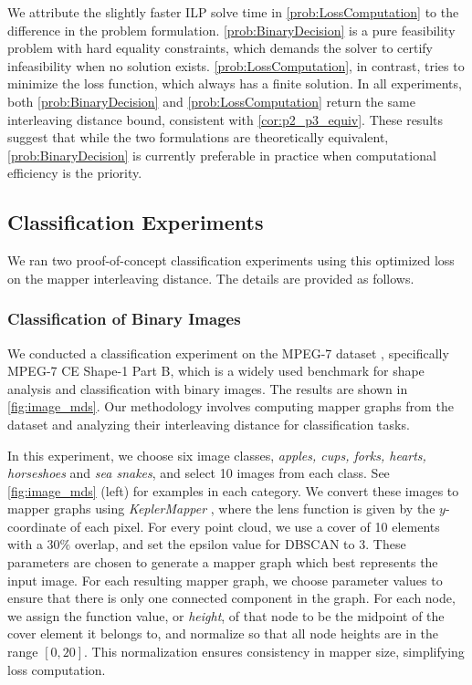 We attribute the slightly faster ILP solve time in \cref{prob:LossComputation} to the difference in the problem formulation.
\cref{prob:BinaryDecision} is a pure feasibility problem with hard equality constraints, which demands the solver to certify infeasibility when no solution exists.
\cref{prob:LossComputation}, in contrast, tries to minimize the loss function, which always has a finite solution.
In all experiments, both \cref{prob:BinaryDecision} and 
\cref{prob:LossComputation} return the same interleaving distance 
bound, consistent with \cref{cor:p2_p3_equiv}.
These results suggest that while the two formulations are theoretically equivalent, \cref{prob:BinaryDecision} is currently preferable in practice when computational efficiency is the priority.

\subsection{Classification Experiments}
\label{ssec:ClassificationBrief}
%

We ran two proof-of-concept classification experiments using this optimized loss on the mapper interleaving distance. 
The details are provided as follows.
\subsubsection{Classification of Binary Images}
\label{ssec:ClassificationMPEG7}
%

We conducted a classification experiment on the MPEG-7 dataset \cite{jeannin1999}, specifically MPEG-7 CE
Shape-1 Part B, which is a widely used benchmark for shape analysis and classification with binary
images.
The results are shown in \cref{fig:image_mds}.
Our methodology involves computing mapper graphs from the dataset and analyzing their interleaving distance for classification tasks.

In this experiment, we choose six image classes, \emph{apples, cups, forks, hearts, horseshoes} and \emph{sea snakes}, and select 10 images from each class.
See \cref{fig:image_mds}  (left) for examples in each category.
We convert these images to mapper graphs using {\it KeplerMapper} \cite{van2019kepler}, where the lens function is given by the $y$-coordinate of each pixel. For every point cloud, we use a cover of 10 elements with a $30\%$ overlap, and set the epsilon value for DBSCAN to 3. These parameters are chosen to generate a mapper graph which best represents the input image.
For each resulting mapper graph, we choose parameter values to ensure that there is only one connected component in the graph.
For each node, we assign the function value, or \emph{height}, of that node to be the midpoint of the cover element it belongs to, and normalize so that all node heights are in the range $[0, 20]$. 
This normalization ensures consistency in mapper size, simplifying loss computation.


